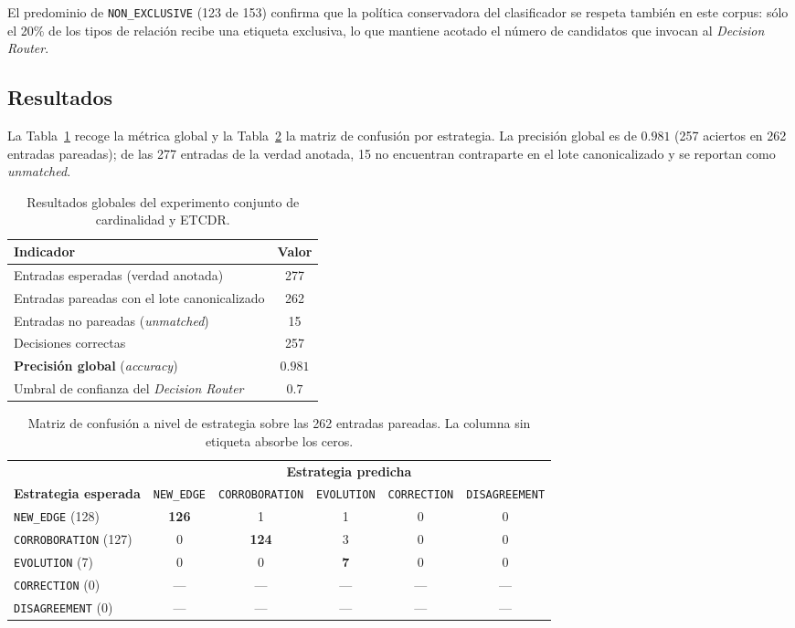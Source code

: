 El predominio de \texttt{NON\_EXCLUSIVE} (123 de 153) confirma que la política conservadora del clasificador se respeta también en este corpus: sólo el 20\% de los tipos de relación recibe una etiqueta exclusiva, lo que mantiene acotado el número de candidatos que invocan al \emph{Decision Router}.

\subsection{Resultados}

La Tabla~\ref{tab:eval-etcdr-scoring} recoge la métrica global y la Tabla~\ref{tab:eval-etcdr-confusion} la matriz de confusión por estrategia. La precisión global es de $0.981$ (257 aciertos en 262 entradas pareadas); de las 277 entradas de la verdad anotada, 15 no encuentran contraparte en el lote canonicalizado y se reportan como \emph{unmatched}.

\begin{table}[h]
\centering
\small
\begin{tabular}{lc}
\hline
\textbf{Indicador} & \textbf{Valor} \\ \hline
Entradas esperadas (verdad anotada) & 277 \\
Entradas pareadas con el lote canonicalizado & 262 \\
Entradas no pareadas (\emph{unmatched}) & 15 \\
Decisiones correctas & 257 \\
\textbf{Precisión global} (\emph{accuracy}) & $\mathbf{0.981}$ \\
Umbral de confianza del \emph{Decision Router} & $0.7$ \\ \hline
\end{tabular}
\caption{Resultados globales del experimento conjunto de cardinalidad y ETCDR.}
\label{tab:eval-etcdr-scoring}
\end{table}

\begin{table}[h]
\centering
\small
\begin{tabular}{lccccc}
\hline
& \multicolumn{5}{c}{\textbf{Estrategia predicha}} \\
\cline{2-6}
\textbf{Estrategia esperada} & \texttt{NEW\_EDGE} & \texttt{CORROBORATION} & \texttt{EVOLUTION} & \texttt{CORRECTION} & \texttt{DISAGREEMENT} \\ \hline
\texttt{NEW\_EDGE} (128) & \textbf{126} & 1 & 1 & 0 & 0 \\
\texttt{CORROBORATION} (127) & 0 & \textbf{124} & 3 & 0 & 0 \\
\texttt{EVOLUTION} (7) & 0 & 0 & \textbf{7} & 0 & 0 \\
\texttt{CORRECTION} (0) & --- & --- & --- & --- & --- \\
\texttt{DISAGREEMENT} (0) & --- & --- & --- & --- & --- \\ \hline
\end{tabular}
\caption{Matriz de confusión a nivel de estrategia sobre las 262 entradas pareadas. La columna sin etiqueta absorbe los ceros.}
\label{tab:eval-etcdr-confusion}
\end{table}

